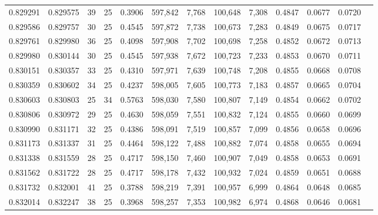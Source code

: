 \begin{tabular}{rrrrrrrrrrrrr}
0.829291 & 0.829575 &    39 &  25 &                                     0.3906 & 597,842 &   7,768 & 100,648 &   7,308 & 0.4847 & 0.0677 & 0.0720 \\
0.829586 & 0.829757 &    30 &  25 &                                     0.4545 & 597,872 &   7,738 & 100,673 &   7,283 & 0.4849 & 0.0675 & 0.0717 \\
0.829761 & 0.829980 &    36 &  25 &                                     0.4098 & 597,908 &   7,702 & 100,698 &   7,258 & 0.4852 & 0.0672 & 0.0713 \\
0.829980 & 0.830144 &    30 &  25 &                                     0.4545 & 597,938 &   7,672 & 100,723 &   7,233 & 0.4853 & 0.0670 & 0.0711 \\
0.830151 & 0.830357 &    33 &  25 &                                     0.4310 & 597,971 &   7,639 & 100,748 &   7,208 & 0.4855 & 0.0668 & 0.0708 \\
0.830359 & 0.830602 &    34 &  25 &                                     0.4237 & 598,005 &   7,605 & 100,773 &   7,183 & 0.4857 & 0.0665 & 0.0704 \\
0.830603 & 0.830803 &    25 &  34 &                                     0.5763 & 598,030 &   7,580 & 100,807 &   7,149 & 0.4854 & 0.0662 & 0.0702 \\
0.830806 & 0.830972 &    29 &  25 &                                     0.4630 & 598,059 &   7,551 & 100,832 &   7,124 & 0.4855 & 0.0660 & 0.0699 \\
0.830990 & 0.831171 &    32 &  25 &                                     0.4386 & 598,091 &   7,519 & 100,857 &   7,099 & 0.4856 & 0.0658 & 0.0696 \\
0.831173 & 0.831337 &    31 &  25 &                                     0.4464 & 598,122 &   7,488 & 100,882 &   7,074 & 0.4858 & 0.0655 & 0.0694 \\
0.831338 & 0.831559 &    28 &  25 &                                     0.4717 & 598,150 &   7,460 & 100,907 &   7,049 & 0.4858 & 0.0653 & 0.0691 \\
0.831562 & 0.831722 &    28 &  25 &                                     0.4717 & 598,178 &   7,432 & 100,932 &   7,024 & 0.4859 & 0.0651 & 0.0688 \\
0.831732 & 0.832001 &    41 &  25 &                                     0.3788 & 598,219 &   7,391 & 100,957 &   6,999 & 0.4864 & 0.0648 & 0.0685 \\
0.832014 & 0.832247 &    38 &  25 &                                     0.3968 & 598,257 &   7,353 & 100,982 &   6,974 & 0.4868 & 0.0646 & 0.0681 \\

\end{tabular}
